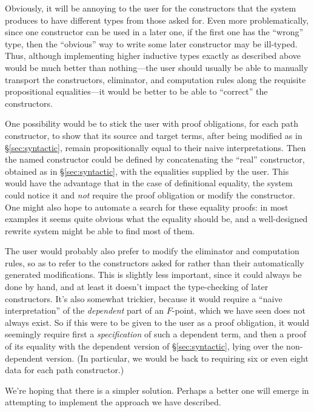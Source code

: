 \documentclass{amsart}
\begin{document}
Obviously, it will be annoying to the user for the constructors that the system produces to have different types from those asked for.  Even more problematically, since one constructor can be used in a later one, if the first one has the ``wrong'' type, then the ``obvious'' way to write some later constructor may be ill-typed.  Thus, although implementing higher inductive types exactly as described above would be much better than nothing---the user should usually be able to manually transport the constructors, eliminator, and computation rules along the requisite propositional equalities---it would be better to be able to ``correct'' the constructors.

One possibility would be to stick the user with proof obligations, for each path constructor, to show that its source and target terms, after being modified as in \S\ref{sec:syntactic}, remain propositionally equal to their naive interpretations.  Then the named constructor could be defined by concatenating the ``real'' constructor, obtained as in \S\ref{sec:syntactic}, with the equalities supplied by the user.  This would have the advantage that in the case of definitional equality, the system could notice it and \emph{not} require the proof obligation or modify the constructor.  One might also hope to automate a search for these equality proofs: in most examples it seems quite obvious what the equality should be, and a well-designed rewrite system might be able to find most of them.

The user would probably also prefer to modify the eliminator and computation rules, so as to refer to the constructors asked for rather than their automatically generated modifications.  This is slightly less important, since it could always be done by hand, and at least it doesn't impact the type-checking of later constructors.  It's also somewhat trickier, because it would require a ``naive interpretation'' of the \emph{dependent} part of an $F$-point, which we have seen does not always exist.  So if this were to be given to the user as a proof obligation, it would seemingly require first a \emph{specification} of such a dependent term, and then a proof of its equality with the dependent version of \S\ref{sec:syntactic}, lying over the non-dependent version.  (In particular, we would be back to requiring six or even eight data for each path constructor.)

We're hoping that there is a simpler solution.  Perhaps a better one will emerge in attempting to implement the approach we have described.
\end{document}
